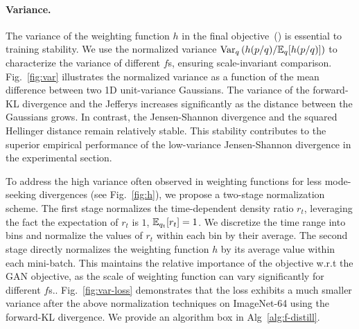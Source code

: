 \paragraph{Variance.}
The variance of the weighting function $h$ in the final objective~() is essential to training stability. We use the normalized variance $\mathrm{Var}_q\left(h(p/q)/\mathbb{E}_q[h(p/q)]\right)$ to characterize the variance of different $f$s, ensuring scale-invariant comparison. Fig.~\ref{fig:var} illustrates the normalized variance as a function of the mean difference between two 1D unit-variance Gaussians. The variance of the forward-KL divergence and the Jefferys 
increases significantly as the distance between the Gaussians grows. In contrast, the Jensen-Shannon divergence and the squared Hellinger distance remain relatively stable. This stability contributes to the superior empirical performance of the low-variance Jensen-Shannon divergence in the experimental section.

To address the high variance often observed in weighting functions for less mode-seeking divergences (see Fig.~\ref{fig:h}), we propose a two-stage normalization scheme. The first stage normalizes the time-dependent density ratio $r_t$, leveraging the fact the expectation of $r_t$ is $1$, \ie $\mathbb{E}_{q_t}[r_t]=1$. We discretize the time range into bins and normalize the values of $r_t$ within each bin by their average. The second stage directly normalizes the weighting function $h$ by its average value within each mini-batch. 
This maintains the relative importance of the \methodtext objective w.r.t the GAN objective, as the scale of weighting function can vary significantly for different $f$s.. Fig.~\ref{fig:var-loss} demonstrates that the loss exhibits a much smaller variance after the above normalization techniques on ImageNet-64 using the forward-KL divergence.  We provide an algorithm box in Alg~\ref{alg:f-distill}. 